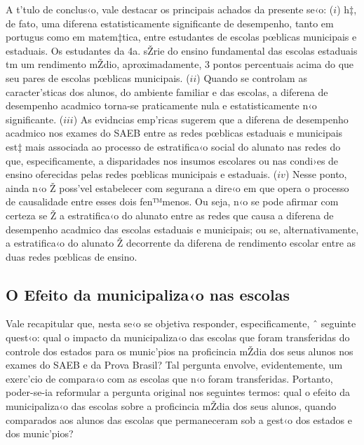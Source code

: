 \documentclass[a4paper, 12pt]{article}
\begin{document}
A t’tulo de conclus‹o, vale destacar os principais achados da presente se‹o: ($i$) h‡, de fato, uma diferena estatisticamente significante de desempenho, tanto em portugus como em matem‡tica, entre estudantes de escolas pœblicas municipais e estaduais. Os estudantes da 4a. sŽrie do ensino fundamental das escolas estaduais tm um rendimento mŽdio, aproximadamente, 3 pontos percentuais acima do que seu pares de escolas pœblicas municipais. ($ii$) Quando se controlam as caracter’sticas dos alunos, do ambiente familiar e das escolas, a diferena de desempenho acadmico torna-se praticamente nula e estatisticamente n‹o significante. ($iii$) As evidncias emp’ricas sugerem que a diferena de desempenho acadmico nos exames do SAEB entre as redes pœblicas estaduais e municipais est‡ mais associada ao processo de estratifica‹o social do alunato nas redes do que, especificamente, a disparidades nos insumos escolares ou nas condi›es de ensino oferecidas pelas redes pœblicas municipais e estaduais. ($iv$) Nesse ponto, ainda n‹o Ž poss’vel estabelecer com segurana a dire‹o em que opera o processo de causalidade entre esses dois fen™menos. Ou seja, n‹o se pode afirmar com certeza se Ž a estratifica‹o do alunato entre as redes que causa a diferena de desempenho acadmico das escolas estaduais e municipais; ou se, alternativamente, a estratifica‹o do alunato Ž decorrente da diferena de rendimento escolar entre as duas redes pœblicas de ensino.  





\pagebreak
\subsection{O Efeito da municipaliza‹o nas escolas}

Vale recapitular que, nesta se‹o se objetiva responder, especificamente, ˆ seguinte quest‹o: qual o impacto da municipaliza‹o das escolas que foram transferidas do controle dos estados para os munic’pios na proficincia mŽdia dos seus alunos nos exames do SAEB e da Prova Brasil? Tal pergunta envolve, evidentemente, um exerc’cio de compara‹o com as escolas que n‹o foram transferidas. Portanto, poder-se-ia reformular a pergunta original nos seguintes termos: qual o efeito da municipaliza‹o das escolas sobre a proficincia mŽdia dos seus alunos, quando comparados aos alunos das escolas que permaneceram sob a gest‹o dos estados e dos munic’pios?
\end{document}
